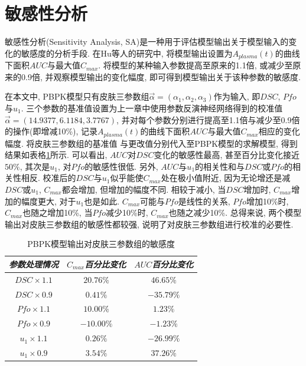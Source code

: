 \documentclass[a4paper,punct=banjiao,twoside]{ctexrep}
\theoremstyle{plain}
\theoremstyle{definition}
\theoremstyle{remark}
\begin{document}
\section{敏感性分析}

敏感性分析(Sensitivity Analysis, SA)是一种用于评估模型输出关于模型输入的变化的敏感度的分析手段\cite{29}.
在Hu等人\cite{11}的研究中, 将模型输出设置为$A_{plasma}(t)$的曲线下面积$AUC$与最大值$C_{max}$. 将模型的某种输入参数提高至原来的1.1倍, 或减少至原来的0.9倍, 并观察模型输出的变化幅度, 
即可得到模型输出关于该种参数的敏感度.

在本文中, PBPK模型只有皮肤三参数组$\vec{\alpha}=(\alpha_1,\alpha_2,\alpha_3)$作为输入, 即$DSC$, $Pfo$与$u_1$. 三个参数的基准值设置为上一章中使用参数反演神经网络得到的校准值
$\vec{\alpha}=(14.9377,  6.1184,  3.7767)$, 并对每个参数分别进行提高至1.1倍与减少至0.9倍的操作(即增减10\%), 记录$A_{plasma}(t)$的曲线下面积$AUC$与最大值$C_{max}$相应的变化幅度. 将皮肤三参数组的基准值
与更改值分别代入至PBPK模型的求解模型, 得到结果如表格\ref{tab9}所示. 可以看出, $AUC$对$DSC$变化的敏感性最高, 甚至百分比变化接近$50\%$, 其次是$u_1$, 对$Pfo$的敏感性很低. 另外, $AUC$与$u_1$的相关性和与$DSC$或$Pfo$的相关性相反.
校准后的$DSC$与$u_1$似乎能使$C_{max}$处在极小值附近, 因为无论增还是减$DSC$或$u_1$, $C_{max}$都会增加, 但增加的幅度不同. 相较于减小, 当$DSC$增加时, $C_{max}$增加的幅度更大, 对于$u_1$也是如此.
$C_{max}$可能与$Pfo$是线性的关系, $Pfo$增加10\%时, $C_{max}$也随之增加10\%, 当$Pfo$减少10\%时, $C_{max}$也随之减少10\%. 总得来说, 两个模型输出对皮肤三参数组的敏感性都较强, 说明了对皮肤三参数组进行校准的必要性.
\begin{table}[htbp]
  \centering
  \begin{tabular}[t]{c*{2}{c}}
    \hline
    \textit{参数处理情况} &$C_{max}$\textit{百分比变化}  &$AUC$\textit{百分比变化}\\
    \hline
    $DSC\times1.1$ & $  20.76\%$ & $ 46.65 \%$  \\ 
    $DSC\times0.9$ & $  0.41\%$ &$  -35.79 \%$   \\ 
    $Pfo\times1.1$ & $  10.00\%$ &$   1.23 \%$   \\ 
    $Pfo\times0.9$ & $  -10.00\%$ &$    -1.23\%$  \\ 
    $u_1\times1.1$ & $  0.26\%$ &$   -26.99 \%$   \\ 
    $u_1\times0.9$ & $  3.54\%$ &$   37.26 \%$  \\ 
    \hline
  \end{tabular}
  \caption{\label{tab9}PBPK模型输出对皮肤三参数组的敏感度} 
\end{table}  
\end{document}
